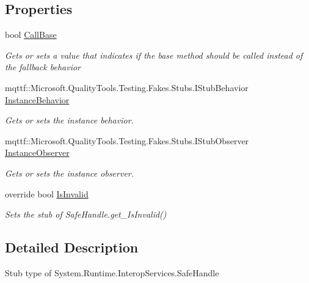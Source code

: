 \subsection*{Properties}
\begin{DoxyCompactItemize}
\item 
bool \hyperlink{class_system_1_1_runtime_1_1_interop_services_1_1_fakes_1_1_stub_safe_handle_ab9c760afce432a9204e025a71143f346}{Call\-Base}
\begin{DoxyCompactList}\small\item\em Gets or sets a value that indicates if the base method should be called instead of the fallback behavior\end{DoxyCompactList}\item 
mqttf\-::\-Microsoft.\-Quality\-Tools.\-Testing.\-Fakes.\-Stubs.\-I\-Stub\-Behavior \hyperlink{class_system_1_1_runtime_1_1_interop_services_1_1_fakes_1_1_stub_safe_handle_ae74ef86be82a7089b81c2f38200d09a3}{Instance\-Behavior}
\begin{DoxyCompactList}\small\item\em Gets or sets the instance behavior.\end{DoxyCompactList}\item 
mqttf\-::\-Microsoft.\-Quality\-Tools.\-Testing.\-Fakes.\-Stubs.\-I\-Stub\-Observer \hyperlink{class_system_1_1_runtime_1_1_interop_services_1_1_fakes_1_1_stub_safe_handle_ad54746a6cf687f9c1256b523e9a13e6f}{Instance\-Observer}
\begin{DoxyCompactList}\small\item\em Gets or sets the instance observer.\end{DoxyCompactList}\item 
override bool \hyperlink{class_system_1_1_runtime_1_1_interop_services_1_1_fakes_1_1_stub_safe_handle_a36915befa44075aa54ab1de603f18e32}{Is\-Invalid}
\begin{DoxyCompactList}\small\item\em Sets the stub of Safe\-Handle.\-get\-\_\-\-Is\-Invalid()\end{DoxyCompactList}\end{DoxyCompactItemize}


\subsection{Detailed Description}
Stub type of System.\-Runtime.\-Interop\-Services.\-Safe\-Handle



